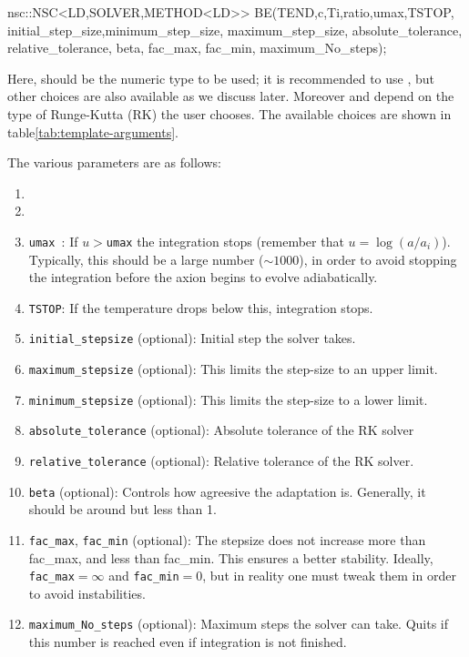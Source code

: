 \documentclass[11pt,a4paper]{article}
\begin{document}
%
\begin{cpp}
    nsc::NSC<LD,SOLVER,METHOD<LD>> BE(TEND,c,Ti,ratio,umax,TSTOP,
		initial_step_size,minimum_step_size, maximum_step_size, 
		absolute_tolerance, relative_tolerance, beta,
		fac_max, fac_min, maximum_No_steps);
\end{cpp}
%
Here,  should be the numeric type to be used; it is recommended to use , but other choices are also available as we discuss later. Moreover  and  depend on the type of Runge-Kutta (RK) the user chooses. The available choices are shown in table\ref{tab:template-arguments}. 

The various parameters are as follows:
%
\begin{enumerate}
	\item 
	\item 
	\item {\tt umax }: If $u>${\tt umax} the integration stops (remember that $u=\log(a/a_i)$). Typically, this should be a large number ($\sim 1000$), in order to avoid stopping the integration before the axion begins to evolve  adiabatically.    
	\item {\tt TSTOP}: If the temperature drops below this, integration stops. 
	
	\item {\tt initial\_stepsize} (optional): Initial step the solver takes. 
	
	\item {\tt maximum\_stepsize} (optional): This limits the step-size to an upper limit. 
	\item {\tt minimum\_stepsize} (optional): This limits the step-size to a lower limit. 
	
	\item {\tt absolute\_tolerance} (optional): Absolute tolerance of the RK solver
	
	\item {\tt relative\_tolerance} (optional): Relative tolerance of the RK solver.
	
	\item {\tt beta} (optional): Controls how agreesive the adaptation is. Generally, it should be around but less than 1.
	
	\item {\tt fac\_max},  {\tt fac\_min} (optional): The stepsize does not increase more than fac\_max, and less than fac\_min. 
	This ensures a better stability. Ideally, {\tt fac\_max}$=\infty$ and {\tt fac\_min}$=0$, but in reality one must 
	tweak them in order to avoid instabilities.
	
	\item {\tt maximum\_No\_steps} (optional): Maximum steps the solver can take. Quits if this number is reached even if integration
	is not finished. 
\end{enumerate}
\end{document}
